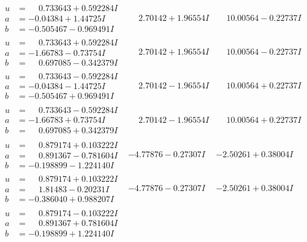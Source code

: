 \documentclass[1p]{elsarticle_modified}
\theoremstyle{definition}
\begin{document}
$$\begin{array}{c|c|c}
\begin{aligned}
u &= \phantom{-}0.733643 + 0.592284 I \\
a &= -0.04384 + 1.44725 I \\
b &= -0.505467 - 0.969491 I\end{aligned}
 & \phantom{-}2.70142 + 1.96554 I & \phantom{-}10.00564 - 0.22737 I \\ \hline\begin{aligned}
u &= \phantom{-}0.733643 + 0.592284 I \\
a &= -1.66783 - 0.73754 I \\
b &= \phantom{-}0.697085 - 0.342379 I\end{aligned}
 & \phantom{-}2.70142 + 1.96554 I & \phantom{-}10.00564 - 0.22737 I \\ \hline\begin{aligned}
u &= \phantom{-}0.733643 - 0.592284 I \\
a &= -0.04384 - 1.44725 I \\
b &= -0.505467 + 0.969491 I\end{aligned}
 & \phantom{-}2.70142 - 1.96554 I & \phantom{-}10.00564 + 0.22737 I \\ \hline\begin{aligned}
u &= \phantom{-}0.733643 - 0.592284 I \\
a &= -1.66783 + 0.73754 I \\
b &= \phantom{-}0.697085 + 0.342379 I\end{aligned}
 & \phantom{-}2.70142 - 1.96554 I & \phantom{-}10.00564 + 0.22737 I \\ \hline\begin{aligned}
u &= \phantom{-}0.879174 + 0.103222 I \\
a &= \phantom{-}0.891367 - 0.781604 I \\
b &= -0.198899 - 1.224140 I\end{aligned}
 & -4.77876 - 0.27307 I & -2.50261 + 0.38004 I \\ \hline\begin{aligned}
u &= \phantom{-}0.879174 + 0.103222 I \\
a &= \phantom{-}1.81483 - 0.20231 I \\
b &= -0.386040 + 0.988207 I\end{aligned}
 & -4.77876 - 0.27307 I & -2.50261 + 0.38004 I \\ \hline\begin{aligned}
u &= \phantom{-}0.879174 - 0.103222 I \\
a &= \phantom{-}0.891367 + 0.781604 I \\
b &= -0.198899 + 1.224140 I\end{aligned}

\end{array}$$
\end{document}
